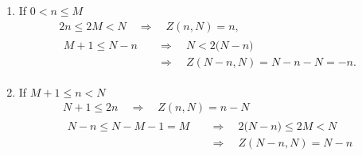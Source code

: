 \documentclass[draft, appendixprefix=true, chapterprefix=true, fontsize=12pt, numbers=noendperiod]{scrbook}
\begin{document}
\begin{enumerate}
\begin{enumerate}
    \setlength{\itemsep}{0pt}
  \item If \(0<n\leq M\)
    \begin{gather*}
      2n\leq 2M<N\quad\Rightarrow\quad Z(n, N)=n,\\
      \begin{aligned}
        M+1\leq N-n&\quad\Rightarrow\quad N<2\bigl(N-n\bigr)\\
        &\quad\Rightarrow\quad Z(N-n, N)=N-n-N=-n.
    \end{aligned}
    \end{gather*}
  \item If \(M+1\leq n<N\)
    \begin{gather*}
      N+1\leq 2n\quad\Rightarrow\quad Z(n, N)=n-N\\
      \begin{aligned}
        N-n\leq N-M-1=M&\quad\Rightarrow\quad 2\bigl(N-n\bigr)\leq 2M<N\\
        &\quad\Rightarrow\quad Z(N-n, N)=N-n
    \end{aligned}
    \end{gather*}
  \end{enumerate}
\end{enumerate}


\printbibliography
\end{document}
